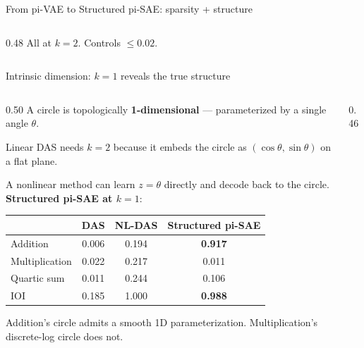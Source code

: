 \documentclass[aspectratio=169,11pt]{beamer}
\begin{document}
\begin{frame}{From pi-VAE to Structured pi-SAE: sparsity + structure}
\begin{columns}[T]
\begin{column}{0.48\textwidth}
\vspace{0.2em}
{\small All at $k{=}2$. Controls $\leq 0.02$.}
\end{column}
\end{columns}

\vspace{0.5em}
\centering
{}
\end{frame}

\begin{frame}{Intrinsic dimension: $k{=}1$ reveals the true structure}

\begin{columns}[T]
\begin{column}{0.50\textwidth}
{\small A circle is topologically \textbf{1-dimensional} --- parameterized by a single angle $\theta$.}

\vspace{0.3em}
{\small Linear DAS needs $k{=}2$ because it embeds the circle as $(\cos\theta, \sin\theta)$ on a flat plane.}

\vspace{0.3em}
{\small A nonlinear method can learn $z = \theta$ directly and decode back to the circle. \textbf{Structured pi-SAE at $k{=}1$}:}

\vspace{0.3em}
{\small\setlength{\tabcolsep}{4pt}
\begin{tabular}{@{}lccc@{}}
\toprule
& \textbf{DAS} & \textbf{NL-DAS} & \textbf{Structured pi-SAE} \\
\midrule
Addition & 0.006 & 0.194 & \textbf{\textcolor{always}{0.917}} \\
Multiplication & 0.022 & 0.217 & 0.011 \\
Quartic sum & 0.011 & 0.244 & 0.106 \\
IOI & 0.185 & 1.000 & \textbf{\textcolor{always}{0.988}} \\
\bottomrule
\end{tabular}}

\vspace{0.3em}
{\small Addition's circle admits a smooth 1D parameterization. Multiplication's discrete-log circle does not.}
\end{column}
\begin{column}{0.46\textwidth}
\centering
{}
\end{column}
\end{columns}
\end{frame}
\end{document}
